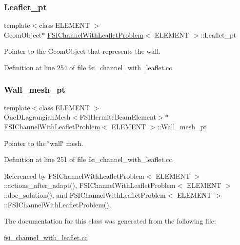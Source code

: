\subsubsection{\texorpdfstring{Leaflet\+\_\+pt}{Leaflet\_pt}}
{\footnotesize\ttfamily template$<$class E\+L\+E\+M\+E\+NT $>$ \\
Geom\+Object$\ast$ \hyperlink{classFSIChannelWithLeafletProblem}{F\+S\+I\+Channel\+With\+Leaflet\+Problem}$<$ E\+L\+E\+M\+E\+NT $>$\+::Leaflet\+\_\+pt\hspace{0.3cm}{\ttfamily [private]}}



Pointer to the Geom\+Object that represents the wall. 



Definition at line 254 of file fsi\+\_\+channel\+\_\+with\+\_\+leaflet.\+cc.

\mbox{\label{classFSIChannelWithLeafletProblem_a943437726f0a54fa8f7fc9ffb12bc4cd}} 
\subsubsection{\texorpdfstring{Wall\+\_\+mesh\+\_\+pt}{Wall\_mesh\_pt}}
{\footnotesize\ttfamily template$<$class E\+L\+E\+M\+E\+NT $>$ \\
One\+D\+Lagrangian\+Mesh$<$F\+S\+I\+Hermite\+Beam\+Element$>$$\ast$ \hyperlink{classFSIChannelWithLeafletProblem}{F\+S\+I\+Channel\+With\+Leaflet\+Problem}$<$ E\+L\+E\+M\+E\+NT $>$\+::Wall\+\_\+mesh\+\_\+pt\hspace{0.3cm}{\ttfamily [private]}}



Pointer to the \char`\"{}wall\char`\"{} mesh. 



Definition at line 251 of file fsi\+\_\+channel\+\_\+with\+\_\+leaflet.\+cc.



Referenced by F\+S\+I\+Channel\+With\+Leaflet\+Problem$<$ E\+L\+E\+M\+E\+N\+T $>$\+::actions\+\_\+after\+\_\+adapt(), F\+S\+I\+Channel\+With\+Leaflet\+Problem$<$ E\+L\+E\+M\+E\+N\+T $>$\+::doc\+\_\+solution(), and F\+S\+I\+Channel\+With\+Leaflet\+Problem$<$ E\+L\+E\+M\+E\+N\+T $>$\+::\+F\+S\+I\+Channel\+With\+Leaflet\+Problem().



The documentation for this class was generated from the following file\+:\begin{DoxyCompactItemize}
\item 
\hyperlink{fsi__channel__with__leaflet_8cc}{fsi\+\_\+channel\+\_\+with\+\_\+leaflet.\+cc}\end{DoxyCompactItemize}
